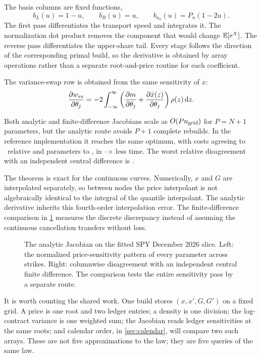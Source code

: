 The basis columns are fixed functions,
\[
b_L(u)=1-u,\qquad b_R(u)=u,\qquad b_{a_n}(u)=P_n(1-2u).
\]
The first pass differentiates the transport speed and integrates it.  The
normalization dot product removes the component that would change
$\mathbb{E}[e^X]$.  The reverse pass differentiates the upper-share tail.  Every
stage follows the direction of the corresponding primal build, so the
derivative is obtained by array operations rather than a separate
root-and-price routine for each coefficient.

The variance-swap row is obtained from the same sensitivity of $x$:
\begin{equation}
\frac{\partial w_{\rm vs}}{\partial\theta_j}
=-2\int_{-\infty}^\infty
\left(\frac{\partial m}{\partial\theta_j}
+\frac{\partial\bar x(z)}{\partial\theta_j}\right)\rho(z)\,\mathrm{d} z.
\label{eq:varswaprow}
\end{equation}

Both analytic and finite-difference Jacobians scale as
$O(Pn_{\rm grid})$ for $P=N+1$ parameters, but the analytic route avoids
$P+1$ complete rebuilds.  In the reference implementation it reaches the
same optimum, with costs agreeing to \MacJacSameOptCost\ relative and
parameters to \MacJacSameOptParams, in
\MacJacSpeedupMin--\MacJacSpeedupMax$\times$ less time.  The worst relative
disagreement with an independent central difference is \MacJacFdMaxRel.

The theorem is exact for the continuous curves.  Numerically, $x$ and $G$ are
interpolated separately, so between nodes the price interpolant is not
algebraically identical to the integral of the quantile interpolant.  The
analytic derivative inherits this fourth-order interpolation error.  The
finite-difference comparison in \cref{fig:jacobian} measures the discrete
discrepancy instead of assuming the continuous cancellation transfers
without loss.

\begin{figure}[htbp]
\centering
{}
\caption{The analytic Jacobian on the fitted SPY December 2026 slice.  Left:
the normalized price-sensitivity pattern of every parameter across strikes.
Right: columnwise disagreement with an independent central finite difference.
The comparison tests the entire sensitivity pass by a separate route.}
\label{fig:jacobian}
\end{figure}

It is worth counting the shared work.  One build stores $(x,x',G,G')$ on a
fixed grid.  A price is one root and two ledger entries; a density is one
division; the log-contract variance is one weighted sum; the Jacobian reads
ledger sensitivities at the same roots; and calendar order, in
\cref{sec:calendar}, will compare two such arrays.  These are not five
approximations to the law; they are five queries of the same law.
